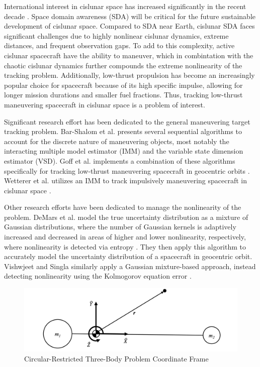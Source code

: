 \documentclass[letterpaper, preprint, paper,11pt]{AAS}	%
\begin{document}
International interest in cislunar space has increased significantly in the recent decade \cite{nelson2024moon}. Space domain awareness (SDA) will be critical for the future sustainable development of cislunar space. Compared to SDA near Earth, cislunar SDA faces significant challenges due to highly nonlinear cislunar dynamics, extreme distances, and frequent observation gaps. To add to this complexity, active cislunar spacecraft have the ability to maneuver, which in combintation with the chaotic cislunar dynamics further compounds the extreme nonlinearity of the tracking problem. Additionally, low-thrust propulsion has become an increasingly popular choice for spacecraft because of its high specific impulse, allowing for longer mission durations and smaller fuel fractions. Thus, tracking low-thrust maneuvering spacecraft in cislunar space is a problem of interest. 

Significant research effort has been dedicated to the general maneuvering target tracking problem. Bar-Shalom et al. presents several sequential algorithms to account for the discrete nature of maneuvering objects, most notably the interacting multiple model estimator \cite{bar1989tracking} (IMM) and the variable state dimension estimator \cite{bar2007variable} (VSD). Goff et al. implements a combination of these algorithms specifically for tracking low-thrust maneuvering spacecraft in geocentric orbits \cite{goff2015orbit}. Wetterer et al. utilizes an IMM to track impulsively maneuvering spacecraft in cislunar space \cite{wetterer2022cislunar}.

Other research efforts have been dedicated to manage the nonlinearity of the problem. DeMars et al. model the true uncertainty distribution as a mixture of Gaussian distributions, where the number of Gaussian kernels is adaptively increased and decreased in areas of higher and lower nonlinearity, respectively, where nonlinearity is detected via entropy \cite{demars2013entropy}. They then apply this algorithm to accurately model the uncertainty distribution of a spacecraft in geocentric orbit. Vishwjeet and Singla similarly apply a Gaussian mixture-based approach, instead detecting nonlinearity using the Kolmogorov equation error \cite{vishwajet2018adaptive}. 

\begin{figure}
    \centering
    \includegraphics[width=1\linewidth]{Figures/CR3BP.png}
    \caption{Circular-Restricted Three-Body Problem Coordinate Frame}
    \label{fig:CR3BP}
\end{figure}
\end{document}
